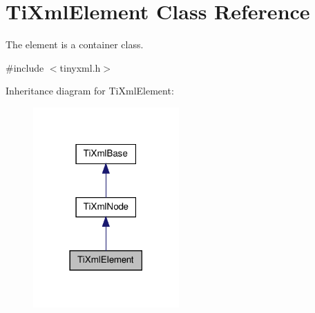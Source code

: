 \hypertarget{classTiXmlElement}{
\section{TiXmlElement Class Reference}
\label{db/d59/classTiXmlElement}
}


The element is a container class.  




{\ttfamily \#include $<$tinyxml.h$>$}



Inheritance diagram for TiXmlElement:
\nopagebreak
\begin{figure}[H]
\begin{center}
\leavevmode
\includegraphics[width=158pt]{d9/dcb/classTiXmlElement__inherit__graph}
\end{center}
\end{figure}


